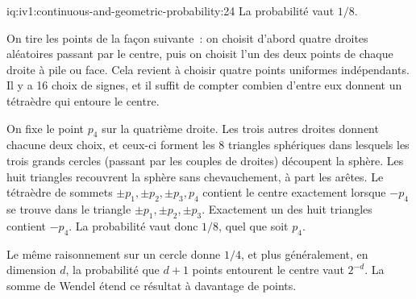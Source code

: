 \enlargethispage{-3\baselineskip}%
\begin{solution}{iq:iv1:continuous-and-geometric-probability:24}
La probabilité vaut $1/8$.

On tire les points de la façon suivante~: on choisit d'abord quatre droites aléatoires passant par le centre, puis on choisit l'un des deux points de chaque droite à pile ou face. Cela revient à choisir quatre points uniformes indépendants. Il y a 16 choix de signes, et il suffit de compter combien d'entre eux donnent un tétraèdre qui entoure le centre.

On fixe le point $p_4$ sur la quatrième droite. Les trois autres droites donnent chacune deux choix, et ceux-ci forment les 8 triangles sphériques dans lesquels les trois grands cercles (passant par les couples de droites) découpent la sphère. Les huit triangles recouvrent la sphère sans chevauchement, à part les arêtes. Le tétraèdre de sommets $\pm p_1, \pm p_2, \pm p_3, p_4$ contient le centre exactement lorsque $-p_4$ se trouve dans le triangle $\pm p_1, \pm p_2, \pm p_3$. Exactement un des huit triangles contient $-p_4$. La probabilité vaut donc $1/8$, quel que soit $p_4$.

Le même raisonnement sur un cercle donne $1/4$, et plus généralement, en dimension $d$, la probabilité que $d + 1$ points entourent le centre vaut $2^{-d}$. La somme de Wendel étend ce résultat à davantage de points.

\end{solution}

